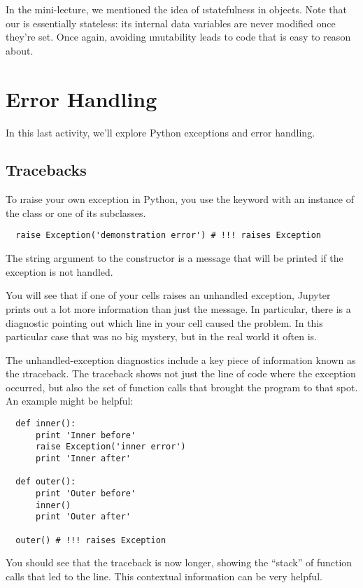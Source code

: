 \documentclass[letterpaper, 12pt, titlepage, twoside]{article}
\begin{document}
In the mini-lecture, we mentioned the idea of \i{statefulness} in objects.
Note that our  is essentially stateless: its internal data
variables are never modified once they're set. Once again, avoiding
\i{mutability} leads to code that is easy to reason about.


\newpage
\section{Error Handling}

In this last activity, we'll explore Python exceptions and error handling.

\subsection*{Tracebacks}

To \i{raise} your own exception in Python, you use the  keyword with
an instance of the  class or one of its subclasses.

\begin{lstlisting}
  raise Exception('demonstration error') # !!! raises Exception
\end{lstlisting}

The string argument to the  constructor is a message that will be
printed if the exception is not handled.

You will see that if one of your cells raises an unhandled exception, Jupyter
prints out a lot more information than just the message. In particular, there
is a diagnostic pointing out which line in your cell caused the problem. In
this particular case that was no big mystery, but in the real world it often
is.

The unhandled-exception diagnostics include a key piece of information known
as the \i{traceback}. The traceback shows not just the line of code where the
exception occurred, but also the set of function calls that brought the
program to that spot. An example might be helpful:

\begin{lstlisting}
  def inner():
      print 'Inner before'
      raise Exception('inner error')
      print 'Inner after'

  def outer():
      print 'Outer before'
      inner()
      print 'Outer after'

  outer() # !!! raises Exception
\end{lstlisting}

You should see that the traceback is now longer, showing the ``stack'' of
function calls that led to the  line. This contextual information can
be very helpful.
\end{document}
